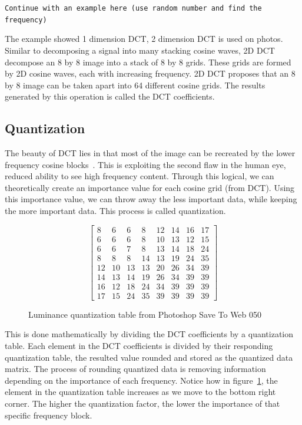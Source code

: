 \documentclass{article}
\begin{document}

\texttt{Continue with an example here (use random number and find the frequency)}

The example showed 1 dimension DCT, 2 dimension DCT is used on photos.
Similar to decomposing a signal into many stacking cosine waves, 2D DCT decompose an 8 by 8 image into a stack of 8 by 8 grids.
These grids are formed by 2D cosine waves, each with increasing frequency.
2D DCT proposes that an 8 by 8 image can be taken apart into 64 different cosine grids.
The results generated by this operation is called the DCT coefficients.

\subsection{Quantization}\label{quantize}
The beauty of DCT lies in that most of the image can be recreated by the lower frequency cosine blocks~\autocite{jpgYT}.
This is exploiting the second flaw in the human eye, reduced ability to see high frequency content.
Through this logical, we can theoretically create an importance value for each cosine grid (from DCT).
Using this importance value, we can throw away the less important data, while keeping the more important data.
This process is called quantization.

\begin{figure}[h]
\centering
\begin{equation}
	\begin{bmatrix}
		8  & 6  & 6  & 8  & 12 & 14 & 16 & 17 \\
		6  & 6  & 6  & 8  & 10 & 13 & 12 & 15 \\
		6  & 6  & 7  & 8  & 13 & 14 & 18 & 24 \\
		8  & 8  & 8  & 14 & 13 & 19 & 24 & 35 \\
		12 & 10 & 13 & 13 & 20 & 26 & 34 & 39 \\
		14 & 13 & 14 & 19 & 26 & 34 & 39 & 39 \\
		16 & 12 & 18 & 24 & 34 & 39 & 39 & 39 \\
		17 & 15 & 24 & 35 & 39 & 39 & 39 & 39
	\end{bmatrix}
\end{equation}
\label{fig:quantization}
\caption{Luminance quantization table from Photoshop Save To Web 050~\autocite{quantization}}
\end{figure}

This is done mathematically by dividing the DCT coefficients by a quantization table.
Each element in the DCT coefficients is divided by their responding quantization table, the resulted value rounded and stored as the quantized data matrix.
The process of rounding quantized data is removing information depending on the importance of each frequency.
Notice how in figure~\ref{fig:quantization}, the element in the quantization table increases as we move to the bottom right corner.
The higher the quantization factor, the lower the importance of that specific frequency block.
\end{document}
